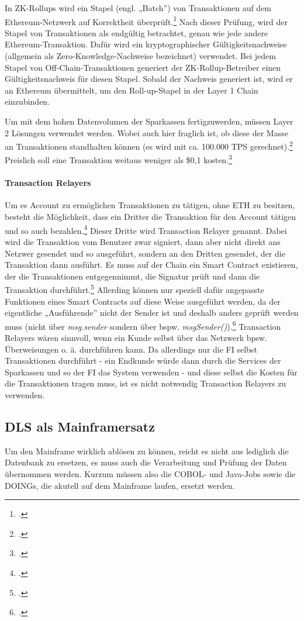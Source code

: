 \documentclass[12pt, a4paper]{article}
\begin{document}
{\begin{itemize}
    \noindent
    In ZK-Rollups wird ein Stapel (engl. „Batch”) von Transaktionen auf dem Ethereum-Netzwerk auf Korrektheit überprüft.\footcite[Vgl. hierzu und zum Folgenden sowie weiterführend][]{w23}
    Nach dieser Prüfung, wird der Stapel von Transaktionen als endgültig betrachtet, genau wie jede andere Ethereum-Transaktion. Dafür wird ein kryptographischer Gültigkeitsnachweise (allgemein als Zero-Knowledge-Nachweise bezeichnet) verwendet. 
    Bei jedem Stapel von Off-Chain-Transaktionen generiert der ZK-Rollup-Betreiber einen Gültigkeitsnachweis für diesen Stapel. Sobald der Nachweis generiert ist, wird er an Ethereum übermittelt, um den Roll-up-Stapel in der Layer 1 Chain einzubinden.
\end{itemize}
\bigbreak
\noindent
Um mit dem hohen Datenvolumen der Sparkassen fertigzuwerden, müssen Layer 2 Lösungen verwendet werden. 
Wobei auch hier fraglich ist, ob diese der Masse an Transaktionen standhalten können (es wird mit ca. 100.000 TPS gerechnet).\footcite[Vgl.][]{w34}
Preislich soll eine Transaktion weitaus weniger als \$0,1 kosten.\footcite[Vgl.][]{w37}


\paragraph{Transaction Relayers}
\label{sec:definition-transaction-relayers}
Um es Account zu ermöglichen Transaktionen zu tätigen, ohne ETH zu besitzen, besteht die Möglichkeit, dass ein Dritter die Transaktion für den Account tätigen und so auch bezahlen.\footcites[Vgl. hierzu und zum Folgenden sowie weiterführend][]{w24}[]{w26}
Dieser Dritte wird Transaction Relayer genannt.
Dabei wird die Transaktion vom Benutzer zwar signiert, dann aber nicht direkt ans Netzwer gesendet und so ausgeführt, sondern an den Dritten gesendet, der die Transaktion dann ausführt.
Es muss auf der Chain ein Smart Contract existieren, der die Transaktionen entgegennimmt, die Signatur prüft und dann die Transaktion durchführt.\footcite[Vgl.][]{w25}
Allerding können nur speziell dafür angepasste Funktionen eines Smart Contracts auf diese Weise ausgeführt werden, da der eigentliche „Ausführende” nicht der Sender ist und deshalb anders geprüft werden muss (nicht über \textit{msg.sender} sondern über bspw. \textit{msgSender()}).\footcites[Vgl.][]{w27}[]{w24}
\bigbreak
\noindent
Transaction Relayers wären sinnvoll, wenn ein Kunde selbst über das Netzwerk bpsw. Überweisungen o. ä. durchführen kann.
Da allerdings nur die FI selbst Transaktionen durchführt - ein Endkunde würde dann durch die Services der Sparkassen und so der FI das System verwenden - und diese selbst die Kosten für die Transaktionen tragen muss, ist es nicht notwendig Transaction Relayers zu verwenden.\subsection{DLS als Mainframersatz}
Um den Mainframe wirklich ablösen zu können, reicht es nicht aus lediglich die Datenbank zu ersetzen, es muss auch die Verarbeitung und Prüfung der Daten übernommen werden.
Kurzum müssen also die COBOL- und Java-Jobs sowie die DOINGs, die akutell auf dem Mainframe laufen, ersetzt werden.

}
\end{document}
